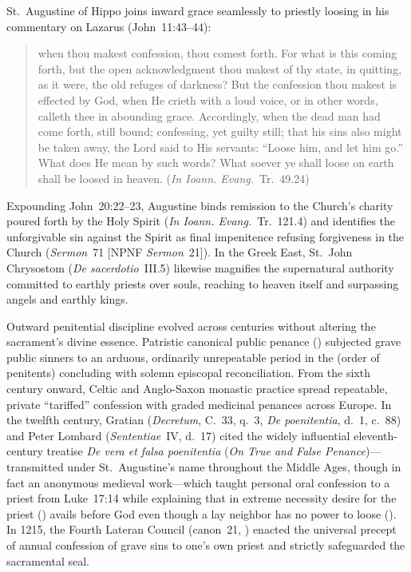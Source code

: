 St.~Augustine of Hippo joins inward grace seamlessly to priestly loosing in his commentary on Lazarus (John~11:43--44):
\begin{quotation}
when thou makest confession, thou comest forth. For what is this coming forth, but the open acknowledgment thou makest of thy state, in quitting, as it were, the old refuges of darkness? But the confession thou makest is effected by God, when He crieth with a loud voice, or in other words, calleth thee in abounding grace. Accordingly, when the dead man had come forth, still bound; confessing, yet guilty still; that his sins also might be taken away, the Lord said to His servants: ``Loose him, and let him go.'' What does He mean by such words? What soever ye shall loose on earth shall be loosed in heaven. (\emph{In Ioann. Evang.}~Tr.~49.24)
\end{quotation}
Expounding John~20:22--23, Augustine binds remission to the Church's charity poured forth by the Holy Spirit (\emph{In Ioann. Evang.}~Tr.~121.4) and identifies the unforgivable sin against the Spirit as final impenitence refusing forgiveness in the Church (\emph{Sermon}~71 [NPNF \emph{Sermon}~21]). In the Greek East, St.~John Chrysostom (\emph{De sacerdotio}~III.5) likewise magnifies the supernatural authority committed to earthly priests over souls, reaching to heaven itself and surpassing angels and earthly kings.

Outward penitential discipline evolved across centuries without altering the sacrament's divine essence. Patristic canonical public penance () subjected grave public sinners to an arduous, ordinarily unrepeatable period in the  (order of penitents) concluding with solemn episcopal reconciliation. From the sixth century onward, Celtic and Anglo-Saxon monastic practice spread repeatable, private ``tariffed'' confession with graded medicinal penances across Europe. In the twelfth century, Gratian (\emph{Decretum}, C.~33, q.~3, \emph{De poenitentia}, d.~1, c.~88) and Peter Lombard (\emph{Sententiae}~IV, d.~17) cited the widely influential eleventh-century treatise \emph{De vera et falsa poenitentia} (\emph{On True and False Penance})---transmitted under St.~Augustine's name throughout the Middle Ages, though in fact an anonymous medieval work---which taught personal oral confession to a priest from Luke~17:14 while explaining that in extreme necessity desire for the priest () avails before God even though a lay neighbor has no power to loose (). In 1215, the Fourth Lateran Council (canon~21, ) enacted the universal precept of annual confession of grave sins to one's own priest and strictly safeguarded the sacramental seal.


